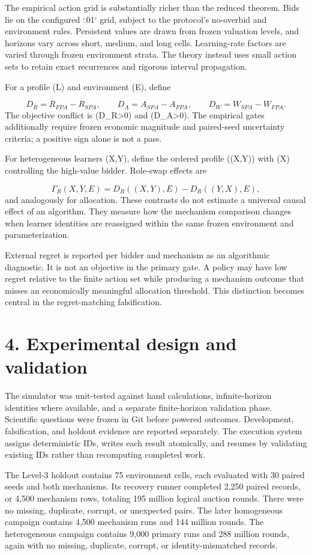 \documentclass[11pt]{article}
\begin{document}
The empirical action grid is substantially richer than the reduced theorem. Bids lie on the configured `.01` grid, subject to the protocol's no-overbid and environment rules. Persistent values are drawn from frozen valuation levels, and horizons vary across short, medium, and long cells. Learning-rate factors are varied through frozen environment strata. The theory instead uses small action sets to retain exact recurrences and rigorous interval propagation.

For a profile (L) and environment (E), define

\[
D_R=R_{FPA}-R_{SPA},\qquad
D_A=A_{SPA}-A_{FPA},\qquad
D_W=W_{SPA}-W_{FPA}.
\]
The objective conflict is (D_R>0) and (D_A>0). The empirical gates additionally require frozen economic magnitude and paired-seed uncertainty criteria; a positive sign alone is not a pass.

For heterogeneous learners (X,Y), define the ordered profile ((X,Y)) with (X) controlling the high-value bidder. Role-swap effects are

\[
\Gamma_R(X,Y,E)=D_R((X,Y),E)-D_R((Y,X),E),
\]
and analogously for allocation. These contrasts do not estimate a universal causal effect of an algorithm. They measure how the mechanism comparison changes when learner identities are reassigned within the same frozen environment and parameterization.

External regret is reported per bidder and mechanism as an algorithmic diagnostic. It is not an objective in the primary gate. A policy may have low regret relative to the finite action set while producing a mechanism outcome that misses an economically meaningful allocation threshold. This distinction becomes central in the regret-matching falsification.

\section{4. Experimental design and validation}
The simulator was unit-tested against hand calculations, infinite-horizon identities where available, and a separate finite-horizon validation phase. Scientific questions were frozen in Git before powered outcomes. Development, falsification, and holdout evidence are reported separately. The execution system assigns deterministic IDs, writes each result atomically, and resumes by validating existing IDs rather than recomputing completed work.

The Level-3 holdout contains 75 environment cells, each evaluated with 30 paired seeds and both mechanisms. Its recovery runner completed 2,250 paired records, or 4,500 mechanism rows, totaling 195 million logical auction rounds. There were no missing, duplicate, corrupt, or unexpected pairs. The later homogeneous campaign contains 4,500 mechanism runs and 144 million rounds. The heterogeneous campaign contains 9,000 primary runs and 288 million rounds, again with no missing, duplicate, corrupt, or identity-mismatched records.
\end{document}

